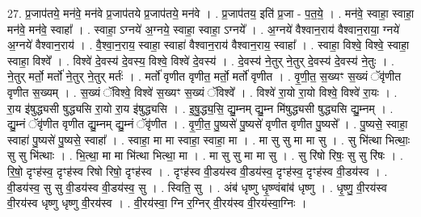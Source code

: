 \documentclass[17pt]{extarticle}
\begin{document}
27. प्र॒जाप॑तये॒ मन॑वे॒ मन॑वे प्र॒जाप॑तये प्र॒जाप॑तये॒ मन॑वे । . प्र॒जाप॑तय॒ इति॑ प्र॒जा - प॒त॒ये॒ । . मन॑वे॒ स्वाहा॒ स्वाहा॒ मन॑वे॒ मन॑वे॒ स्वाहा᳚ । . स्वाहा॒ ऽग्नये॑ अ॒ग्नये॒ स्वाहा॒ स्वाहा॒ ऽग्नये᳚ । . अ॒ग्नये॑ वैश्वान॒राय॑ वैश्वान॒राया॒ ग्नये॑ अ॒ग्नये॑ वैश्वान॒राय॑ । . वै॒श्वा॒न॒राय॒ स्वाहा॒ स्वाहा॑ वैश्वान॒राय॑ वैश्वान॒राय॒ स्वाहा᳚ । . स्वाहा॒ विश्वे॒ विश्वे॒ स्वाहा॒ स्वाहा॒ विश्वे᳚ । . विश्वे॑ दे॒वस्य॑ दे॒वस्य॒ विश्वे॒ विश्वे॑ दे॒वस्य॑ । . दे॒वस्य॑ ने॒तुर् ने॒तुर् दे॒वस्य॑ दे॒वस्य॑ ने॒तुः । . ने॒तुर् मर्तो॒ मर्तो॑ ने॒तुर् ने॒तुर् मर्तः॑ । . मर्तो॑ वृणीत वृणीत॒ मर्तो॒ मर्तो॑ वृणीत । . वृ॒णी॒त॒ स॒ख्यꣳ स॒ख्यं ॅवृ॑णीत वृणीत स॒ख्यम् । . स॒ख्यं ॅविश्वे॒ विश्वे॑ स॒ख्यꣳ स॒ख्यं ॅविश्वे᳚ । . विश्वे॑ रा॒यो रा॒यो विश्वे॒ विश्वे॑ रा॒यः । . रा॒य इ॑षुद्ध्यसी षुद्ध्यसि रा॒यो रा॒य इ॑षुद्ध्यसि । . इ॒षु॒द्ध्य॒सि॒ द्यु॒म्नम् द्यु॒म्न मि॑षुद्ध्यसी षुद्ध्यसि द्यु॒म्नम् । . द्यु॒म्नं ॅवृ॑णीत वृणीत द्यु॒म्नम् द्यु॒म्नं ॅवृ॑णीत । . वृ॒णी॒त॒ पु॒ष्यसे॑ पु॒ष्यसे॑ वृणीत वृणीत पु॒ष्यसे᳚ । . पु॒ष्यसे॒ स्वाहा॒ स्वाहा॑ पु॒ष्यसे॑ पु॒ष्यसे॒ स्वाहा᳚ । . स्वाहा॒ मा मा स्वाहा॒ स्वाहा॒ मा । . मा सु सु मा मा सु । . सु भि॑त्था भित्थाः॒ सु सु भि॑त्थाः । . भि॒त्था॒ मा मा भि॑त्था भित्था॒ मा । . मा सु सु मा मा सु । . सु रि॑षो रिषः॒ सु सु रि॑षः । . रि॒षो॒ दृꣳह॑स्व॒ दृꣳह॑स्व रिषो रिषो॒ दृꣳह॑स्व । . दृꣳह॑स्व वी॒डय॑स्व वी॒डय॑स्व॒ दृꣳह॑स्व॒ दृꣳह॑स्व वी॒डय॑स्व । . वी॒डय॑स्व॒ सु सु वी॒डय॑स्व वी॒डय॑स्व॒ सु । . स्विति॒ सु । . अंब॑ धृष्णु धृ॒ष्ण्वंबांब॑ धृष्णु । . धृ॒ष्णु॒ वी॒रय॑स्व वी॒रय॑स्व धृष्णु धृष्णु वी॒रय॑स्व । . वी॒रय॑स्वा॒ ग्नि र॒ग्निर् वी॒रय॑स्व वी॒रय॑स्वा॒ग्निः । \newline
\end{document}
